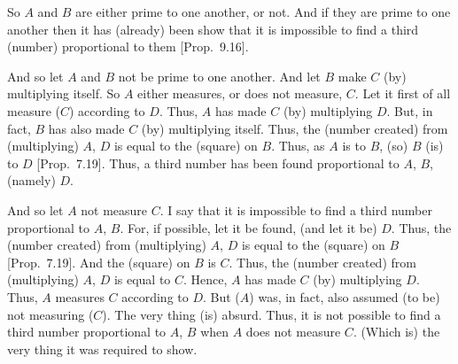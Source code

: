 \begin{Parallel}{}{}
{So $A$ and $B$ are either prime to one another, or not. 
And if they are prime to one another then it has (already) been show that it is impossible
to find a third (number) proportional to them [Prop.~9.16].

And so let $A$ and $B$ not be prime to one another. And let $B$ make $C$
(by) multiplying itself. So $A$ either measures, or does not measure, $C$. 
Let it first of all measure ($C$) according to $D$. Thus, $A$ has made
$C$ (by) multiplying $D$. But, in fact, $B$ has also made
$C$ (by) multiplying itself. Thus, the (number created) from (multiplying)
$A$, $D$ is equal to the (square) on $B$. Thus, as $A$ is to $B$, (so)
$B$ (is) to $D$ [Prop.~7.19]. Thus, a third number
has been found proportional to $A$, $B$, (namely) $D$. 

And so let $A$ not measure $C$. I say that it is impossible to find a third
number proportional to $A$, $B$. For, if possible, let it be found,
(and let it be) $D$. Thus, the (number created) from (multiplying) $A$, $D$
is equal to the (square) on $B$ [Prop.~7.19]. 
And the (square) on $B$ is $C$. Thus, the (number created) from (multiplying) $A$, $D$
is equal to $C$. Hence, $A$ has made $C$ (by) multiplying $D$. 
Thus, $A$ measures $C$ according to $D$. But ($A$) was, in fact, also assumed
(to be) not measuring ($C$). The very thing (is) absurd. Thus, it is not
possible to find a third number proportional to $A$, $B$ when $A$ does not
measure $C$. (Which is) the very thing it was required to show.}
\end{Parallel}

